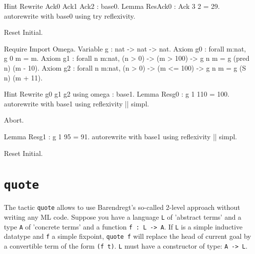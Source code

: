\begin{coq_example*}
\begin{coq_example}
Hint Rewrite Ack0 Ack1 Ack2 : base0.
Lemma ResAck0 : 
 Ack 3 2 = 29.
autorewrite with base0 using try reflexivity.
\end{coq_example}

\begin{coq_eval}
Reset Initial.
\end{coq_eval}


\begin{coq_example*}
Require Import Omega.
Variable g :   
           nat -> nat -> nat.
Axiom g0 : 
        forall m:nat, g 0 m = m.
Axiom
  g1 :
    forall n m:nat,
      (n > 0) -> (m > 100) -> g n m = g (pred n) (m - 10).
Axiom
  g2 :
    forall n m:nat,
      (n > 0) -> (m <= 100) -> g n m = g (S n) (m + 11).
\end{coq_example*}

\begin{coq_example}
Hint Rewrite g0 g1 g2 using omega : base1.
Lemma Resg0 : 
 g 1 110 = 100.
autorewrite with base1 using reflexivity || simpl.
\end{coq_example}

\begin{coq_eval}
Abort.
\end{coq_eval}

\begin{coq_example}
Lemma Resg1 : g 1 95 = 91.
autorewrite with base1 using reflexivity || simpl.
\end{coq_example}

\begin{coq_eval}
Reset Initial.
\end{coq_eval}

\section[\tt quote]{\tt quote
\label{quote-examples}}

The tactic \texttt{quote} allows to use Barendregt's so-called
2-level approach without writing any ML code. Suppose you have a
language \texttt{L} of 
'abstract terms' and a type \texttt{A} of 'concrete terms' 
and a function \texttt{f : L -> A}. If \texttt{L} is a simple
inductive datatype and \texttt{f} a simple fixpoint, \texttt{quote f}
will replace the head of current goal by a convertible term of the form 
\texttt{(f t)}. \texttt{L} must have a constructor of type: \texttt{A
  -> L}. 


\end{coq_example*}
